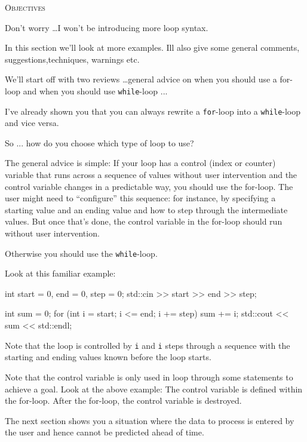 \newpage{}

\textsc{Objectives}

Don't worry \ldots I won't be
introducing more loop syntax.

In this section we'll look at more examples.
Ill also give some general comments, suggestions,techniques, warnings etc.

We'll start off with two reviews \ldots general advice
on when you should use a for-loop and when you should use \texttt{while}-loop ...

\newpage{}

I've already shown you that you can always rewrite a \texttt{for}-loop into a \texttt{while}-loop and vice versa.

So ... how do you choose which type of loop to use?

The general advice is simple: If your loop has a control (index or
counter) variable that runs across a sequence of values without user
intervention and the control variable changes in a predictable way, you
should use the for-loop. The user might need to ``configure'' this
sequence: for instance, by specifying a starting value and an ending
value and how to step through the intermediate values. But once
that's done, the control variable in the for-loop should
run without user intervention.

Otherwise you should use the \texttt{while}-loop.

Look at this familiar example:
\begin{console}
int start = 0, end = 0, step = 0;
std::cin >> start >> end >> step;

int sum = 0;
for (int i = start; i <= end; i += step)
{   
    sum += i;
}
std::cout << sum << std::endl; 
\end{console}

Note that the loop is controlled by \texttt{i} and \texttt{i} steps through
a sequence with the starting and ending values known before the loop
starts.

Note that the control variable is only used in loop through some
statements to achieve a goal. Look at the above example: The control
variable is defined within the for-loop. After the for-loop, the control
variable is destroyed.

The next section shows you a situation where the data to process is
entered by the user and hence cannot be predicted ahead of time.

\newpage{}

